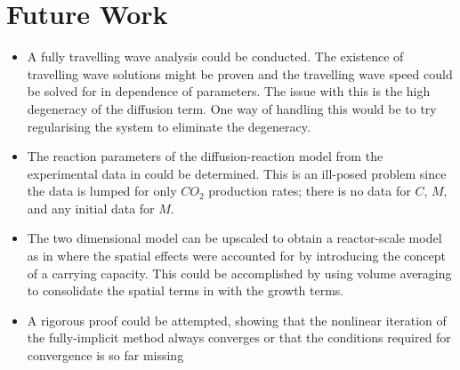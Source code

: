 \section{Future Work}


\begin{itemize}

  \item A fully travelling wave analysis could be conducted.
    The existence of travelling wave solutions might be proven and the travelling wave speed could be solved for in dependence of parameters.
    The issue with this is the high degeneracy of the diffusion term.
    One way of handling this would be to try regularising the system to eliminate the degeneracy.

  \item The reaction parameters of the diffusion-reaction model from the experimental data in \cite{dumitrache2015mathematicalModeling} could be determined.
    This is an ill-posed problem since the data is lumped for only $CO_2$ production rates; there is no data for $C$, $M$, and any initial data for $M$. 

  \item The two dimensional model can be upscaled to obtain a reactor-scale model as in \cite{dumitrache2015mathematicalModeling} where the spatial effects were accounted for by introducing the concept of a carrying capacity.
    This could be accomplished by using volume averaging to consolidate the spatial terms in with the growth terms.

  \item A rigorous proof could be attempted, showing that the nonlinear iteration of the fully-implicit method always converges or that the conditions required for convergence is so far missing

\end{itemize}
